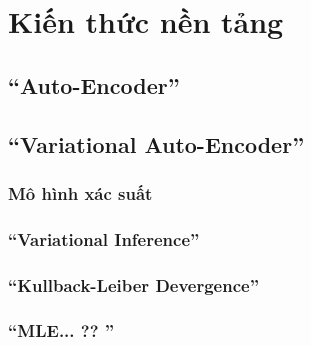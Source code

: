 \chapter{Kiến thức nền tảng}
\label{Chapter2}

\section{``Auto-Encoder''}
\section{``Variational Auto-Encoder''}
    \subsection{Mô hình xác suất}
    \subsection{``Variational Inference''}
    \subsection{``Kullback-Leiber Devergence''}
    \subsection{``MLE... ?? ''}
